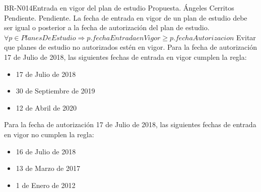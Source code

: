 \begin{BusinessRule}{BR-N014}{Entrada en vigor del plan de estudio}
	{\bcIntegridad}    %
	{\btEnabler}     %
	{\blControlling}    %
	\BRItem[Estado] Propuesta.
	 Ángeles Cerritos
	 Pendiente.
	 Pendiente.
	\BRItem[Descripción] La fecha de entrada en vigor de un plan de estudio debe ser igual o posterior a la fecha de autorización del plan de estudio.
	\BRItem[Sentencia]
	$	\forall p \in PlanesDeEstudio \Rightarrow p.fechaEntradaenVigor \geq p.fechaAutorizacion $
	\BRItem[Motivación] Evitar que planes de estudio no autorizados estén en vigor.
	 Para la fecha de autorización 17 de Julio de 2018, las siguientes fechas de entrada en vigor cumplen la regla:
	\begin{itemize}
		\item 17 de Julio de 2018
		\item 30 de Septiembre de 2019
		\item 12 de Abril de 2020
	\end{itemize}
	 Para la fecha de autorización 17 de Julio de 2018, las siguientes fechas de entrada en vigor no cumplen la regla:
	\begin{itemize}
		\item 16 de Julio de 2018
		\item 13 de Marzo de 2017
		\item 1 de Enero de 2012
	\end{itemize}

	
\end{BusinessRule}


